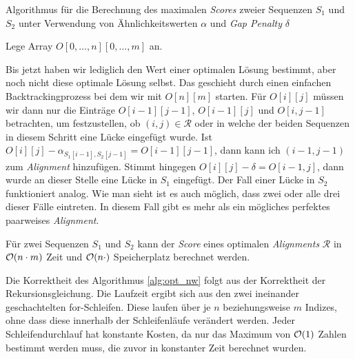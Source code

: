 \begin{algorithm}
	\caption{Algorithmus für die Berechnung des maximalen \emph{Scores} zweier Sequenzen $S_1$ und $S_2$ unter Verwendung von Ähnlichkeitswerten $\alpha$ und \emph{Gap Penalty} $\delta$}
	\label{alg:opt_nw}
	\begin{algorithmic}[1]
		\State Lege Array $O[0,\dots,n][0,\dots,m]$ an.
		 
		\EndFor
		 
		\EndFor
			\EndFor
		\EndFor
		\EndProcedure
	\end{algorithmic}
\end{algorithm}

Bis jetzt haben wir lediglich den Wert einer optimalen Lösung bestimmt, aber noch nicht diese optimale Lösung selbst. Das geschieht durch einen einfachen Backtrackingprozess bei dem wir mit $O[n][m]$ starten. Für $O[i][j]$ müssen wir dann nur die Einträge $O[i-1][j-1]$, $O[i-1][j]$ und $O[i,j-1]$ betrachten, um festzustellen, ob $(i,j) \in \mathcal{R}$ oder in welche der beiden Sequenzen in diesem Schritt eine Lücke eingefügt wurde. Ist $O[i][j] - \alpha_{S_1[i-1],S_2[j-1]} = O[i-1][j-1]$, dann kann ich $(i-1,j-1)$ zum \emph{Alignment} hinzufügen. Stimmt hingegen $O[i][j] - \delta = O[i-1,j]$, dann wurde an dieser Stelle eine Lücke in $S_1$ eingefügt. Der Fall einer Lücke in $S_2$ funktioniert analog. Wie man sieht ist es auch möglich, dass zwei oder alle drei dieser Fälle eintreten. In diesem Fall gibt es mehr als ein mögliches perfektes paarweises \emph{Alignment}. 

\begin{lemma}
	Für zwei Sequenzen $S_1$ und $S_2$ kann der \emph{Score} eines optimalen \emph{Alignments} $\mathcal{R}$ in $\mathcal{O}(n\cdot m)$ Zeit und $\mathcal{O}(n\cdot)$ Speicherplatz berechnet werden.
\end{lemma}

\begin{beweis}
	Die Korrektheit des Algorithmus \ref{alg:opt_nw} folgt aus der Korrektheit der Rekursionsgleichung. Die Laufzeit ergibt sich aus den zwei ineinander geschachtelten for-Schleifen. Diese laufen über je $n$ beziehungsweise $m$ Indizes, ohne dass diese innerhalb der Schleifenläufe verändert werden. Jeder Schleifendurchlauf hat konstante Kosten, da nur das Maximum von $\mathcal{O}(1)$ Zahlen bestimmt werden muss, die zuvor in konstanter Zeit berechnet wurden.
\end{beweis}

